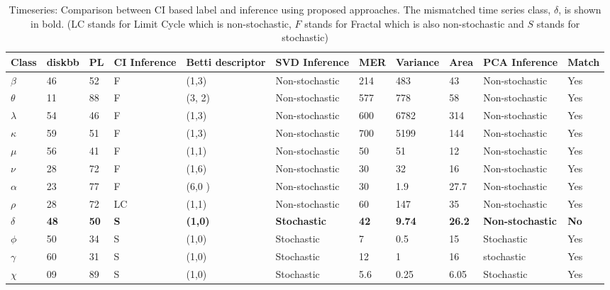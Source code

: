 \documentclass[journal]{IEEEtran}
\begin{document}
\begin{table}[t]
\caption{Timeseries: Comparison between CI based label and inference using proposed approaches. The mismatched time series class, $\delta$, is shown in bold. (LC stands for Limit Cycle \cite{Adegoke2018} which is non-stochastic, $F$ stands for Fractal which is also non-stochastic and $S$ stands for stochastic)}
\begin{center}
\begin{tabular}{|p{0.5cm}|p{0.75cm}|p{0.75cm}|p{1cm}|p{2.5cm}|p{3cm}|p{0.75cm}|p{1cm}|p{0.5cm}|p{1.8cm}|p{0.75cm}|}
\hline
Class & diskbb & PL  & CI \newline Inference & Betti descriptor & SVD  \newline Inference & MER & Variance & Area & PCA \newline Inference  &  Match \\
\hline
$\beta$ & 46 & 52 & F & (1,3) & Non-stochastic & 214 & 483 & 43 & Non-stochastic & Yes\\
\hline
$\theta$  & 11 &  88 & F & (3, 2) & Non-stochastic & 577 & 778 & 58&Non-stochastic  &  Yes \\
\hline
$\lambda$ &  54 & 46 & F & (1,3) & Non-stochastic & 600 & 6782 & 314 & Non-stochastic & Yes \\
\hline
$\kappa$ &  59 & 51 & F & (1,3) & Non-stochastic & 700 & 5199 & 144 & Non-stochastic &  Yes \\
\hline
$\mu$  & 56 & 41 & F & (1,1) & Non-stochastic & 50 & 51 & 12 & Non-stochastic & Yes \\
\hline
$\nu$  & 28 & 72 & F & (1,6) & Non-stochastic & 30 & 32 & 16 & Non-stochastic & Yes\\
\hline
$\alpha$  & 23 & 77& F & (6,0 ) & Non-stochastic & 30 & 1.9 & 27.7 & Non-stochastic & Yes \\
\hline
$\rho$  & 28 & 72 & LC & (1,1) &  Non-stochastic & 60 & 147 & 35 & Non-stochastic & Yes \\
\hline
\textbf{$\delta$}  & \textbf{48} & \textbf{50} &  \textbf{S} & \textbf{(1,0)}& \textbf{Stochastic}& \textbf{42} & \textbf{9.74} & \textbf{26.2} & \textbf{Non-stochastic} &  \textbf{No} \\
\hline
$\phi$  & 50 & 34 & S & (1,0)& Stochastic & 7 & 0.5 & 15 & Stochastic &  Yes \\
\hline
$\gamma$  & 60 & 31 & S & (1,0)& Stochastic & 12 & 1 & 16 & stochastic &  Yes \\
\hline
$\chi$  & 09 & 89 & S & (1,0)& Stochastic & 5.6 & 0.25 & 6.05 & Stochastic &  Yes \\
\hline
\end{tabular}
\label{tab:results}
\end{center}
\end{table}
\end{document}
